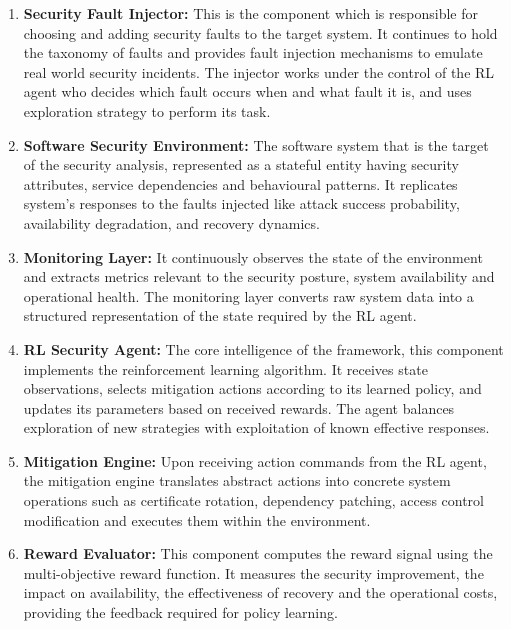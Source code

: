 \documentclass[pdflatex,sn-mathphys-num]{sn-jnl}%
\theoremstyle{thmstyleone}%
\theoremstyle{thmstyletwo}%
\theoremstyle{thmstylethree}%
\begin{document}
	\begin{enumerate}
		\item \textbf{Security Fault Injector:} This is the component which is responsible for choosing and adding security faults to the target system. It continues to hold the taxonomy of faults and provides fault injection mechanisms to emulate real world security incidents. The injector works under the control of the RL agent who decides which fault occurs when and what fault it is, and uses exploration strategy to perform its task.
		
		\item \textbf{Software Security Environment:} The software system that is the target of the security analysis, represented as a stateful entity having security attributes, service dependencies and behavioural patterns. It replicates system's responses to the faults injected like attack success probability, availability degradation, and recovery dynamics.
		
		\item \textbf{Monitoring Layer:} It continuously observes the state of the environment and extracts metrics relevant to the security posture, system availability and operational health. The monitoring layer converts raw system data into a structured representation of the state required by the RL agent. 
		
		\item \textbf{RL Security Agent:} The core intelligence of the framework, this component implements the reinforcement learning algorithm. It receives state observations, selects mitigation actions according to its learned policy, and updates its parameters based on received rewards. The agent balances exploration of new strategies with exploitation of known effective responses.
		
		\item \textbf{Mitigation Engine:} Upon receiving action commands from the RL agent, the mitigation engine translates abstract actions into concrete system operations such as certificate rotation, dependency patching, access control modification and executes them within the environment.
		
		\item \textbf{Reward Evaluator:} This component computes the reward signal using the multi-objective reward function. It measures the security improvement, the impact on availability, the effectiveness of recovery and the operational costs, providing the feedback required for policy learning.
	\end{enumerate}
	
\end{document}
